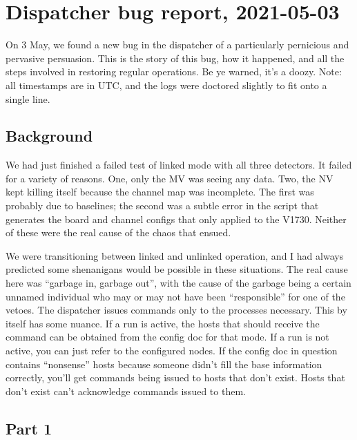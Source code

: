 \chapter{Dispatcher bug report, 2021-05-03}\label{ch:bugreport}

On 3 May, we found a new bug in the dispatcher of a particularly pernicious and pervasive persuasion.
This is the story of this bug, how it happened, and all the steps involved in restoring regular operations.
Be ye warned, it's a doozy.
Note: all timestamps are in UTC, and the logs were doctored slightly to fit onto a single line.

\section{Background}

We had just finished a failed test of linked mode with all three detectors.
It failed for a variety of reasons.
One, only the MV was seeing any data.
Two, the NV kept killing itself because the channel map was incomplete.
The first was probably due to baselines; the second was a subtle error in the script that generates the board and channel configs that only applied to the V1730.
Neither of these were the real cause of the chaos that ensued.

We were transitioning between linked and unlinked operation, and I had always predicted some shenanigans would be possible in these situations.
The real cause here was ``garbage in, garbage out'', with the cause of the garbage being a certain unnamed individual who may or may not have been ``responsible'' for one of the vetoes.
The dispatcher issues commands only to the processes necessary.
This by itself has some nuance.
If a run is active, the hosts that should receive the command can be obtained from the config doc for that mode.
If a run is not active, you can just refer to the configured nodes.
If the config doc in question contains ``nonsense'' hosts because someone didn't fill the base information correctly, you'll get commands being issued to hosts that don't exist.
Hosts that don't exist can't acknowledge commands issued to them.

\section{Part 1}

